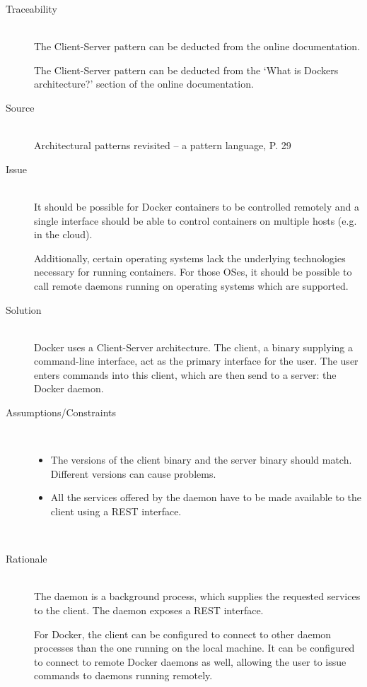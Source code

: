 \begin{description}
\item [Traceability]~\\
The Client-Server pattern can be deducted from the online documentation\cite{dockerarchi}.

The Client-Server pattern can be deducted from the `What is Dockers architecture?' section of the online documentation\cite{dockerarchi}.

\item [Source]~\\
Architectural patterns revisited -- a pattern language, P. 29 \cite{avgeriou2005architectural}

\item [Issue]~\\
It should be possible for Docker containers to be controlled remotely and a single interface should be able to control containers on multiple hosts (e.g. in the cloud).

Additionally, certain operating systems lack the underlying technologies necessary for running containers. For those OSes, it should be possible to call remote daemons running on operating systems which are supported. %

\item [Solution]~\\
Docker uses a {Client-Server} architecture. The client, a binary supplying a command-line interface, act as the primary interface for the user. The user enters commands into this client, which are then send to a server: the Docker daemon. 


\item [Assumptions/Constraints]~
\begin{itemize}
\item The versions of the client binary and the server binary should match. Different versions can cause problems.
\item All the services offered by the daemon have to be made available to the client using a REST interface.
\end{itemize}
~\\[-1.7cm]
\item [Rationale] ~\\
The daemon is a background process, which supplies the requested services to the client. The daemon exposes a REST interface.

For Docker, the client can be configured to connect to other daemon processes than the one running on the local machine. It can be configured to connect to remote Docker daemons as well, allowing the user to issue commands to daemons running remotely.


\end{description}
